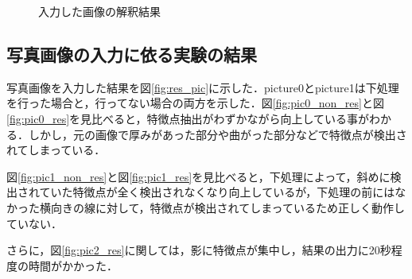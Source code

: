\documentclass{jarticle}
\begin{document}
\begin{figure}[H]
{		\label{fig:sample4_res}}
	\caption{入力した画像の解釈結果}
	\label{fig:res_image}
\end{figure}



\subsection{写真画像の入力に依る実験の結果}
写真画像を入力した結果を図\ref{fig:res_pic}に示した．picture0とpicture1は下処理を行った場合と，行ってない場合の両方を示した．図\ref{fig:pic0_non_res}と図\ref{fig:pic0_res}を見比べると，特徴点抽出がわずかながら向上している事がわかる．しかし，元の画像で厚みがあった部分や曲がった部分などで特徴点が検出されてしまっている．

図\ref{fig:pic1_non_res}と図\ref{fig:pic1_res}を見比べると，下処理によって，斜めに検出されていた特徴点が全く検出されなくなり向上しているが，下処理の前にはなかった横向きの線に対して，特徴点が検出されてしまっているため正しく動作していない．

さらに，図\ref{fig:pic2_res}に関しては，影に特徴点が集中し，結果の出力に20秒程度の時間がかかった．
\end{document}
